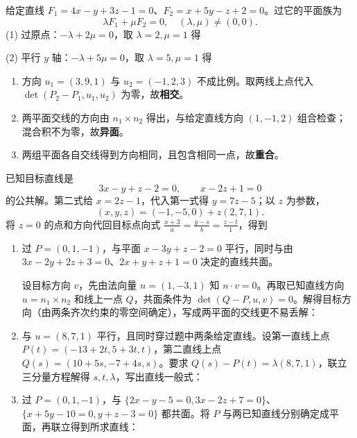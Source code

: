 给定直线 $F_1=4x-y+3z-1=0$、$F_2=x+5y-z+2=0$。过它的平面族为
\[\lambda F_1+\mu F_2=0,\quad (\lambda,\mu)\ne(0,0).\]
(1) 过原点：$-\lambda+2\mu=0$，取 $\lambda=2,\mu=1$ 得

(2) 平行 $y$ 轴：$-\lambda+5\mu=0$，取 $\lambda=5,\mu=1$ 得

\begin{enumerate}[label=(\arabic*)]
\item 方向 $u_1=(3,9,1)$ 与 $u_2=(-1,2,3)$ 不成比例。取两线上点代入 $\det(P_2-P_1,u_1,u_2)$ 为零，故\textbf{相交}。
\item 两平面交线的方向由 $n_1\times n_2$ 得出，与给定直线方向 $(1,-1,2)$ 组合检查；混合积不为零，故\textbf{异面}。
\item 两组平面各自交线得到方向相同，且包含相同一点，故\textbf{重合}。
\end{enumerate}

已知目标直线是
\[3x-y+z-2=0,\qquad x-2z+1=0\]
的公共解。第二式给 $x=2z-1$，代入第一式得 $y=7z-5$；以 $z$ 为参数，
\[(x,y,z)=(-1,-5,0)+z(2,7,1).\]
将 $z=0$ 的点和方向代回目标点向式 $\frac{x+3}{a}=\frac{y-s}{b}=\frac{z-t}{1}$，得到

\begin{enumerate}[label=(\arabic*)]
\item 过 $P=(0,1,-1)$，与平面 $x-3y+z-2=0$ 平行，同时与由 $3x-2y+2z+3=0$、$2x+y+z+1=0$ 决定的直线共面。

设目标方向 $v$，先由法向量 $n=(1,-3,1)$ 知 $n\cdot v=0$。再取已知直线方向 $u=n_1\times n_2$ 和线上一点 $Q$，共面条件为 $\det(Q-P,u,v)=0$。解得目标方向（由两条齐次约束的零空间确定），写成两平面的交线更不易丢解：

\item 与 $u=(8,7,1)$ 平行，且同时穿过题中两条给定直线。设第一直线上点 $P(t)=(-13+2t,5+3t,t)$，第二直线上点 $Q(s)=(10+5s,-7+4s,s)$。要求 $Q(s)-P(t)=\lambda(8,7,1)$，联立三分量方程解得 $s,t,\lambda$，写出直线一般式：

\item 过 $P=(0,1,-1)$，与 $\{2x-y-5=0,3x-2z+7=0\}$、$\{x+5y-10=0,y+z-3=0\}$ 都共面。将 $P$ 与两已知直线分别确定成平面，再联立得到所求直线：
\end{enumerate}

